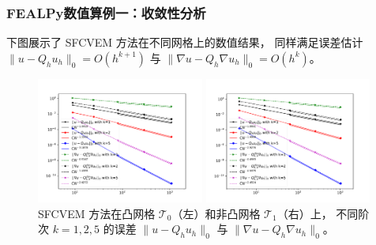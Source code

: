 \documentclass[notheorems,serif]{beamer}
\begin{document}
\begin{frame}
\frametitle{FEALPy数值算例一：收敛性分析}
下图展示了 SFCVEM 方法在不同网格上的数值结果，
同样满足误差估计 $\|u - Q_h u_h\|_0=O(h^{k+1})$ 与
$\|\nabla u - Q_{h}\nabla u_h\|_0=O(h^{k})$。

\begin{figure}[htbp]
\centering
\begin{minipage}[t]{0.49\linewidth}
\centering
\includegraphics[width=5.5cm]{../figures/stabfree/cvem_convex.pdf}
\end{minipage}%
\begin{minipage}[t]{0.49\linewidth}
\centering
\includegraphics[width=5.5cm]{../figures/stabfree/cvem_nonconvex.pdf}
\end{minipage}%
\centering
\caption{SFCVEM 方法在凸网格 $\mathcal T_0$（左）和非凸网格 $\mathcal T_1$（右）上，
不同阶次 $k=1,2,5$ 的误差 $\|u - Q_h u_h\|_0$ 与 $\|\nabla u - Q_{h}\nabla u_h\|_0$。}
\label{fig:rate2}
\end{figure}
\end{frame}
\end{document}
